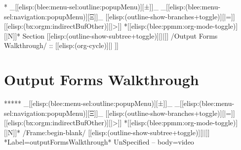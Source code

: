 \begin{whenOrg}
\begin{verblatex}
\begin{frame}[fragile,plain,label=resultingOutputs]


\end{frame}
\end{verblatex}



\begin{whenOrg}
*  _[[elisp:(blee:menu-sel:outline:popupMenu)][±]]_ _[[elisp:(blee:menu-sel:navigation:popupMenu)][Ξ]]_ [[elisp:(outline-show-branches+toggle)][|=]] [[elisp:(bx:orgm:indirectBufOther)][|>]] *[[elisp:(blee:ppmm:org-mode-toggle)][|N]]*  Section    [[elisp:(outline-show-subtree+toggle)][||]]   /Output Forms Walkthrough/ ::  [[elisp:(org-cycle)][| ]]
\end{whenOrg}

\section{Output Forms Walkthrough}

\begin{whenOrg}
*****  _[[elisp:(blee:menu-sel:outline:popupMenu)][±]]_ _[[elisp:(blee:menu-sel:navigation:popupMenu)][Ξ]]_ [[elisp:(outline-show-branches+toggle)][|=]] [[elisp:(bx:orgm:indirectBufOther)][|>]] *[[elisp:(blee:ppmm:org-mode-toggle)][|N]]*  /Frame:begin-blank/ [[elisp:(outline-show-subtree+toggle)][||]] *Label=outputFormsWalkthrough* UnSpecified -- body=video
\end{whenOrg}

\begin{frame}[fragile,plain,label=outputFormsWalkthrough]
    \frametitle{}


\end{frame}
\end{whenOrg}
